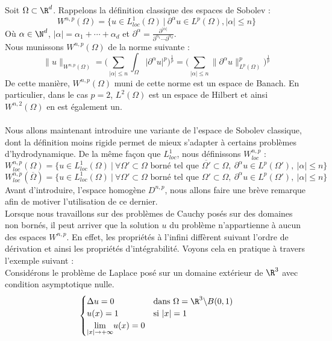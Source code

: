 Soit $\Omega \subset \R^d$. Rappelons la définition classique des espaces de Sobolev :
$$ W^{n,p}(\Omega) = \big\{ u \in L^1_{loc}(\Omega) \ \big| \ \partial^{\alpha}u \in L^p(\Omega), |\alpha| \leq n \big\} $$
Où $\alpha \in \N^d$, $|\alpha| = \alpha_1 + \cdots + \alpha_d $ et $\displaystyle \partial^{\alpha} = \frac{\partial^{|\alpha|}}{\partial^{\alpha_1}\cdots \partial^{\alpha_d}}$.\\
Nous munissons $W^{n,p}(\Omega)$ de la norme suivante :
$$ \| u \|_{W^{n,p}(\Omega)} = \Bigg( \sum_{|\alpha| \leq n} \int_{\Omega} \big|\partial^{\alpha} u \big|^p \Bigg)^{\frac{1}{p}} = \Bigg( \sum_{|\alpha| \leq n} \| \partial^{\alpha}u \|_{L^p(\Omega)}^p \Bigg)^{\frac{1}{p}}  $$
De cette manière, $W^{n,p}(\Omega)$ muni de cette norme est un espace de Banach. En particulier, dans le cas $p = 2$, $L^2(\Omega)$ est un espace de Hilbert et ainsi $W^{n,2}(\Omega)$ en est également un.\\
\\
Nous allons maintenant introduire une variante de l'espace de Sobolev classique, dont la définition moins rigide permet de mieux s'adapter à certains problèmes d'hydrodynamique.
De la même façon que $L^1_{loc}$, nous définissons $W^{n,p}_{loc}$ : 
$$ W_{loc}^{n,p}(\Omega) = \big\{ u \in L^1_{loc}(\Omega) \ \big| \ \forall \Omega' \subset \Omega \text{ borné tel que } \overline{\Omega'} \subset \Omega, \ \partial^{\alpha}u \in L^p(\Omega'),\ |\alpha| \leq n \big\} $$
$$ W_{loc}^{n,p}(\overline{\Omega}) = \big\{ u \in L^1_{loc}(\Omega) \ \big| \ \forall \Omega' \subset \Omega \text{ borné tel que } \Omega' \subset \Omega, \ \partial^{\alpha}u \in L^p(\Omega'),\ |\alpha| \leq n \big\} $$
Avant d'introduire, l'espace homogène $D^{n,p}$, nous allons faire une brève remarque afin de motiver l'utilisation de ce dernier.\\
Lorsque nous travaillons sur des problèmes de Cauchy posés sur des domaines non bornés, il peut arriver que la solution $u$ du problème n'appartienne à aucun des espaces $W^{n,p}$. En effet, les propriétés
à l'infini diffèrent suivant l'ordre de dérivation et ainsi les propriétés d'intégrabilité. Voyons cela en pratique à travers l'exemple suivant \cite{Galdi} :\\
Considérons le problème de Laplace posé sur un domaine extérieur de $\R^3$ avec condition asymptotique nulle.
$$\begin{cases}
    \Delta u = 0 \quad &\text{dans } \Omega = \R^3 \backslash B(0,1) \\
    u(x) = 1 &\text{si } |x| = 1 \\
    \underset{|x| \to +\infty}{\lim} u(x) = 0
\end{cases}$$
